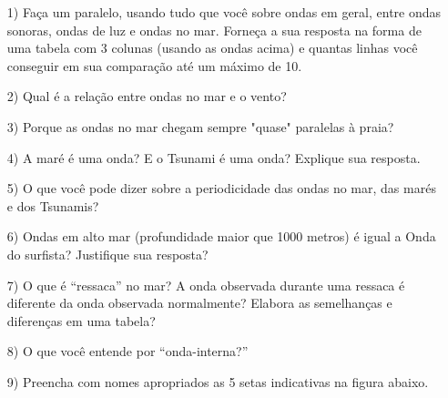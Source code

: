 \documentclass[a4paper,10pt]{article}
\begin{document}
    \begin{itemize}
      \item[1)] Faça um paralelo, usando tudo que você sobre ondas em geral, entre
            ondas sonoras, ondas de luz e ondas no mar.  Forneça a sua resposta
            na forma de uma tabela com 3 colunas (usando as ondas acima) e
            quantas linhas você conseguir em sua comparação até um máximo de 10.
      \item[2)] Qual é a relação entre ondas no mar e o vento?
      \item[3)] Porque as ondas no mar chegam sempre "quase" paralelas à praia?
      \item[4)] A maré é uma onda?  E o Tsunami é uma onda?  Explique sua resposta.
      \item[5)] O que você pode dizer sobre a periodicidade das ondas no mar, das
            marés e dos Tsunamis?
      \item[6)] Ondas em alto mar (profundidade maior que 1000 metros) é igual a
            Onda do surfista?  Justifique sua resposta?
      \item[7)] O que é ``ressaca'' no mar?  A onda observada durante uma ressaca é
            diferente da onda observada normalmente?  Elabora as semelhanças e
            diferenças em uma tabela?
      \item[8)] O que você entende por ``onda-interna?''

      \item[9)] Preencha com nomes apropriados as 5 setas indicativas na figura
            abaixo.


\end{itemize}
\end{document}

